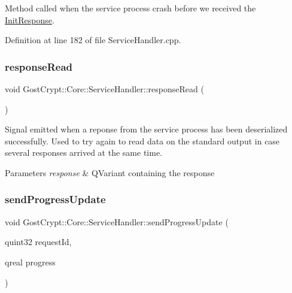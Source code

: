 Method called when the service process crash before we received the \hyperlink{struct_gost_crypt_1_1_core_1_1_init_response}{Init\+Response}. 



Definition at line 182 of file Service\+Handler.\+cpp.

\mbox{\label{class_gost_crypt_1_1_core_1_1_service_handler_aeda23480583f6dcdb90911a82c303c85}} 
\subsubsection{\texorpdfstring{response\+Read}{responseRead}}
{\footnotesize\ttfamily void Gost\+Crypt\+::\+Core\+::\+Service\+Handler\+::response\+Read (\begin{DoxyParamCaption}{ }\end{DoxyParamCaption})\hspace{0.3cm}{\ttfamily [signal]}}



Signal emitted when a reponse from the service process has been deserialized successfully. Used to try again to read data on the standard output in case several responses arrived at the same time. 


\begin{DoxyParams}{Parameters}
{\em response} & Q\+Variant containing the response \\
\hline
\end{DoxyParams}
\mbox{\label{class_gost_crypt_1_1_core_1_1_service_handler_a35d44e8648665d200a9f0cebf3d0deb7}} 
\subsubsection{\texorpdfstring{send\+Progress\+Update}{sendProgressUpdate}}
{\footnotesize\ttfamily void Gost\+Crypt\+::\+Core\+::\+Service\+Handler\+::send\+Progress\+Update (\begin{DoxyParamCaption}\item[{quint32}]{request\+Id,  }\item[{qreal}]{progress }\end{DoxyParamCaption})\hspace{0.3cm}{\ttfamily [signal]}}



